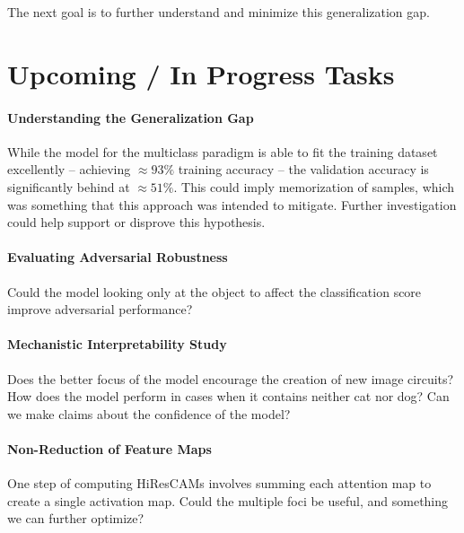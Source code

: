 \documentclass{article}
\begin{document}
The next goal is to further understand and minimize this generalization gap.

\section{Upcoming / In Progress Tasks} 

\paragraph{Understanding the Generalization Gap} While the model for the multiclass paradigm is able to fit the training dataset excellently -- achieving $\approx 93\%$ training accuracy -- the validation accuracy is significantly behind at $\approx 51\%$. This could imply memorization of samples, which was something that this approach was intended to mitigate. Further investigation could help support or disprove this hypothesis.

\paragraph{Evaluating Adversarial Robustness} Could the model looking only at the object to affect the classification score improve adversarial performance?

\paragraph{Mechanistic Interpretability Study} Does the better focus of the model encourage the creation of new image circuits? How does the model perform in cases when it contains neither cat nor dog? Can we make claims about the confidence of the model?

\paragraph{Non-Reduction of Feature Maps} One step of computing HiResCAMs involves summing each attention map to create a single activation map. Could the multiple foci be useful, and something we can further optimize?



\end{document}
